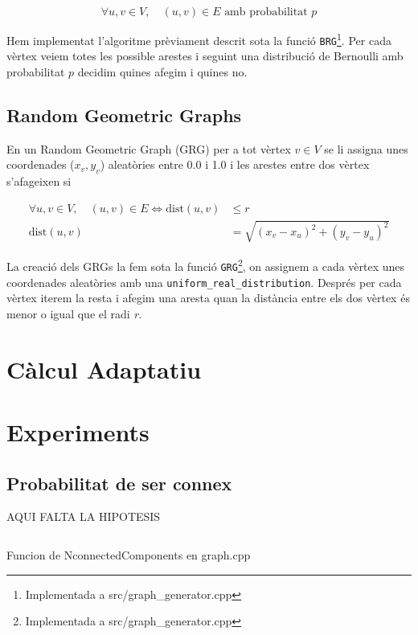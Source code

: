 \begin{equation}
    \forall u,v \in V,\quad (u,v) \in E \text{ amb probabilitat } p
\end{equation}

Hem implementat l'algoritme prèviament descrit sota la funció \texttt{BRG}\footnote{Implementada a src/graph\_generator.cpp}. Per cada vèrtex veiem totes les possible arestes i seguint una distribució de Bernoulli amb probabilitat $p$ decidim quines afegim i quines no.

\subsection{Random Geometric Graphs}
En un Random Geometric Graph (GRG)\cite{Diaz2007On} per a tot vèrtex $v \in V$ se li assigna unes coordenades ($x_v, y_v$) aleatòries entre 0.0 i 1.0 i les arestes entre dos vèrtex s'afageixen si

\begin{align}
    \forall u,v \in V,\quad (u,v) \in E \Longleftrightarrow \text{dist}(u,v) &\leq r \\
    \text{dist}(u,v) &= \sqrt{\left(x_v - x_u\right)^2 + \left(y_v - y_u\right)^2}
\end{align}

La creació dels GRGs la fem sota la funció \texttt{GRG}\footnote{Implementada a src/graph\_generator.cpp}, on assignem a cada vèrtex unes coordenades aleatòries amb una \texttt{uniform\_real\_distribution}. Després per cada vèrtex iterem la resta i afegim una aresta quan la distància entre els dos vèrtex és menor o igual que el radi \textit{r}.

\section{Càlcul Adaptatiu}

\section{Experiments}

\subsection{Probabilitat de ser connex}
AQUI FALTA LA HIPOTESIS

\begin{listing}
\inputminted[firstline=99,lastline=136]{cpp}{src/graph.cpp}
\caption{Funcion de NconnectedComponents en graph.cpp}
\end{listing}


